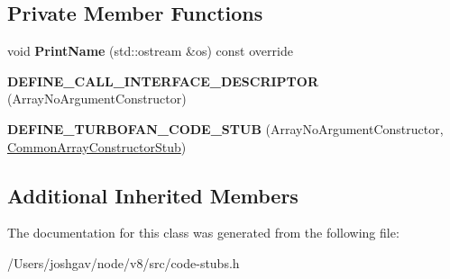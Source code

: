 \subsection*{Private Member Functions}
\begin{DoxyCompactItemize}
\item 
void {\bfseries Print\+Name} (std\+::ostream \&os) const  override\hypertarget{classv8_1_1internal_1_1_array_no_argument_constructor_stub_a668c8407f86ca97b62a5fcf6267790a6}{}\label{classv8_1_1internal_1_1_array_no_argument_constructor_stub_a668c8407f86ca97b62a5fcf6267790a6}

\item 
{\bfseries D\+E\+F\+I\+N\+E\+\_\+\+C\+A\+L\+L\+\_\+\+I\+N\+T\+E\+R\+F\+A\+C\+E\+\_\+\+D\+E\+S\+C\+R\+I\+P\+T\+OR} (Array\+No\+Argument\+Constructor)\hypertarget{classv8_1_1internal_1_1_array_no_argument_constructor_stub_a97a9e4dc7c7a0b4b9be966bf517001f4}{}\label{classv8_1_1internal_1_1_array_no_argument_constructor_stub_a97a9e4dc7c7a0b4b9be966bf517001f4}

\item 
{\bfseries D\+E\+F\+I\+N\+E\+\_\+\+T\+U\+R\+B\+O\+F\+A\+N\+\_\+\+C\+O\+D\+E\+\_\+\+S\+T\+UB} (Array\+No\+Argument\+Constructor, \hyperlink{classv8_1_1internal_1_1_common_array_constructor_stub}{Common\+Array\+Constructor\+Stub})\hypertarget{classv8_1_1internal_1_1_array_no_argument_constructor_stub_a1048e0b060ffbdc29da7be3bd4900bd7}{}\label{classv8_1_1internal_1_1_array_no_argument_constructor_stub_a1048e0b060ffbdc29da7be3bd4900bd7}

\end{DoxyCompactItemize}
\subsection*{Additional Inherited Members}


The documentation for this class was generated from the following file\+:\begin{DoxyCompactItemize}
\item 
/\+Users/joshgav/node/v8/src/code-\/stubs.\+h\end{DoxyCompactItemize}

